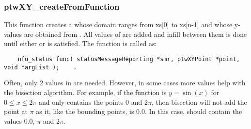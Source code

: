 \subsubsection{ptwXY\_createFromFunction}
This function creates a  whose domain ranges from xs[0] to xs[n-1] and whose y-values
are obtained from . All values of  are added
and infill between them is done until either  or  is satisfied.
The function  is called as:
\begin{verbatim}
    nfu_status func( statusMessageReporting *smr, ptwXYPoint *point, void *argList );    .
\end{verbatim}

Often, only 2 values in  are needed. However, in some cases more values help with the bisection algorithm.
For example, if the function is $y = \sin(x)$ for $0 \le x \le 2 \pi$ and  only contains the points
0 and $2 \pi$, then bisection will not add the point at $\pi$ as it, like the bounding points, is 0.0. In this case,
 should contain the values 0.0, $\pi$ and $2 \pi$.

